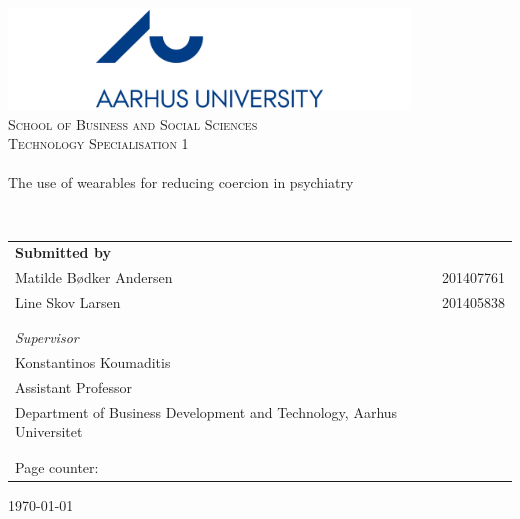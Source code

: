 \begin{titlingpage}
\begin{center}

~ \\[2.0cm]

\includegraphics[width=0.8\textwidth]{Figure/Ase} ~\\[0.5cm]

\textsc{\LARGE School of Business and Social Sciences}\\[0.5cm]

\textsc{\Large Technology Specialisation 1} ~\\[1.0cm]


\noindent\makebox[\linewidth]{\rule{\textwidth}{0.4pt}}\\
[0.5cm]{\Huge The use of wearables for reducing coercion in psychiatry}
\noindent\makebox[\linewidth]{\rule{\textwidth}{0.4pt}}

\end{center}
~ \\[0.5cm]



\begin{table}[H]
\begin{tabular}{ll}
\textbf{Submitted by} & \\
Matilde Bødker Andersen  & 201407761 \\
Line Skov Larsen & 201405838 \\

\\ \\
\textit{Supervisor} & \\
Konstantinos Koumaditis & \\
Assistant Professor & \\
Department of Business Development and Technology, Aarhus Universitet & \\[1ex]
\\ \\
Page counter: \pageref{LastPage} & \\
\end{tabular}
\end{table}
		

\vfill

\begin{center}
{\large \today}

\end{center}


\end{titlingpage}

\cleardoublepage